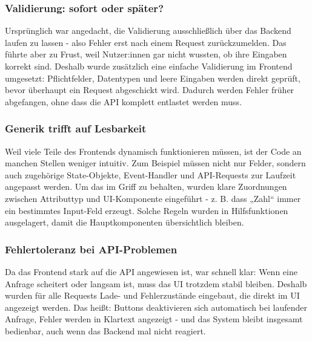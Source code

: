 \subsubsection*{Validierung: sofort oder später?}
Ursprünglich war angedacht, die Validierung ausschließlich über das Backend laufen zu lassen - also Fehler erst nach einem Request zurückzumelden. Das führte aber zu 
Frust, weil Nutzer:innen gar nicht wussten, ob ihre Eingaben korrekt sind.  
Deshalb wurde zusätzlich eine einfache Validierung im Frontend umgesetzt: Pflichtfelder, Datentypen und leere Eingaben werden direkt geprüft, bevor überhaupt ein 
Request abgeschickt wird. Dadurch werden Fehler früher abgefangen, ohne dass die API komplett entlastet werden muss.

\subsubsection*{Generik trifft auf Lesbarkeit}
Weil viele Teile des Frontends dynamisch funktionieren müssen, ist der Code an manchen Stellen weniger intuitiv. Zum Beispiel müssen nicht nur Felder, sondern auch 
zugehörige State-Objekte, Event-Handler und API-Requests zur Laufzeit angepasst werden.  
Um das im Griff zu behalten, wurden klare Zuordnungen zwischen Attributtyp und UI-Komponente eingeführt - z. B. dass „Zahl“ immer ein bestimmtes Input-Feld erzeugt. 
Solche Regeln wurden in Hilfsfunktionen ausgelagert, damit die Hauptkomponenten übersichtlich bleiben.

\subsubsection*{Fehlertoleranz bei API-Problemen}
Da das Frontend stark auf die API angewiesen ist, war schnell klar: Wenn eine Anfrage scheitert oder langsam ist, muss das UI trotzdem stabil bleiben.  
Deshalb wurden für alle Requests Lade- und Fehlerzustände eingebaut, die direkt im UI angezeigt werden. Das heißt: Buttons deaktivieren sich automatisch bei 
laufender Anfrage, Fehler werden in Klartext angezeigt - und das System bleibt insgesamt bedienbar, auch wenn das Backend mal nicht reagiert.

